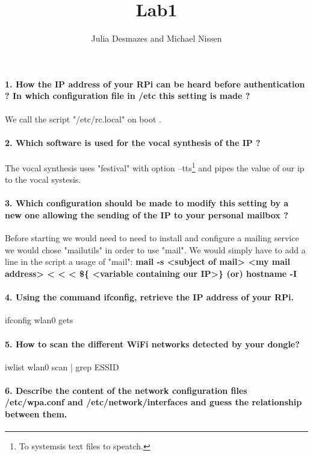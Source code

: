 \documentclass[10pt,a4paper]{article}
\author{Julia Desmazes and Michael Nissen}
\title{Lab1}
\begin{document}
\paragraph{1. How the IP address of your RPi can be heard before authentication ? In which configuration file
in /etc this setting is made ?}
\vspace{0.5cm}
We call the script "/etc/rc.local" on boot .
\paragraph{2. Which software is used for the vocal synthesis of the IP ?}\vspace{0.5cm}

The vocal synthesis uses "festival" with option --tts\footnote{To systemsis text files to speatch.} and pipes the value of our ip to the vocal systesis.
\paragraph{3. Which configuration should be made to modify this setting by a new one allowing the sending of
the IP to your personal mailbox ?}\vspace{0.5cm}

Before starting we would need to need to install and configure a mailing service we would chose "mailutils" in order to use "mail". We would simply have to add a line in the script a usage of "mail":
\textbf{mail -s <subject of mail> <my mail address> < < < \$\{ <variable containing our IP>\} (or) hostname -I }
\paragraph{4. Using the command ifconfig, retrieve the IP address of your RPi.}\vspace{0.5cm}

ifconfig wlan0 gets 
\paragraph{5. How to scan the different WiFi networks detected by your dongle?}\vspace{0.5cm}

iwlist wlan0 scan | grep ESSID
\paragraph{6. Describe the content of the network configuration files /etc/wpa.conf and /etc/network/interfaces
and guess the relationship between them.}\vspace{0.5cm}
\end{document}
